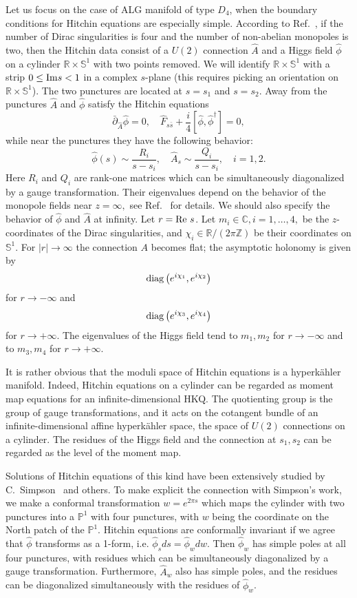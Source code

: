 \documentclass[a4paper,12pt, amsfonts, amssymb]{article}
\newcommand{\CC}{{\mathbb C}}
\newcommand{\RR}{{\mathbb R}}
\newcommand{\ZZ}{{\mathbb Z}}
\newcommand{\PP}{{\mathbb P}}
\renewcommand{\SS}{{\mathbb S}}
\newcommand{\diag}{{\rm diag}}
\newcommand{\ra}{\rightarrow}
\newcommand{\hphi}{{\hat\phi}}
\newcommand{\hA}{{\hat A}}
\newcommand{\bpartial}{{\bar\partial}}
\newcommand{\hF}{{\hat F}}
\newcommand{\bs}{{\bar s}}
\begin{document}
Let us focus on the case of ALG manifold of type $D_4$, when
the boundary conditions for Hitchin equations are especially simple.
According to Ref.~\cite{ustwo}, if the number of Dirac singularities is
four and the number of non-abelian monopoles is two, then the Hitchin data
consist of a $U(2)$ connection $\hA$ and a Higgs field $\hphi$ on a cylinder
$\RR\times\SS^1$ with two points removed. We will identify $\RR\times\SS^1$
with a strip $0\leq {\rm Im} s < 1$ in a complex $s$-plane (this requires picking an orientation on $\RR\times\SS^1$). The two punctures
are located at $s=s_1$ and $s=s_2$.
Away from the punctures $\hA$ and $\hphi$ satisfy the Hitchin
equations~\cite{HitchinSpec}
$$
\bpartial_\hA\hphi=0,\quad
\hF_{s\bs}+\frac{i}{4}\left[\hphi,\hphi^\dag\right]=0,
$$
while near the punctures they have the following behavior:
$$
\hphi(s)\sim \frac{R_i}{s-s_i},\quad \hA_s\sim \frac{Q_i}{s-s_i},\quad i=1,2.
$$
Here $R_i$ and $Q_i$ are rank-one matrices which can be simultaneously
diagonalized by a gauge transformation. Their eigenvalues depend on the
behavior of the monopole fields near $z=\infty,$ see Ref.~\cite{ustwo} for details.
We should also specify the behavior of $\hphi$ and $\hA$ at infinity.
Let $r={\rm Re}\ s$. Let $m_i\in\CC, i=1,\ldots,4,$ be the $z$-coordinates
of the Dirac singularities, and $\chi_i\in \RR/(2\pi\ZZ)$ be their
coordinates on $\SS^1$.
For $|r|\ra\infty$ the connection $A$ becomes flat; the asymptotic holonomy is given by
$$
\diag\left(e^{i\chi_1},e^{i\chi_2}\right)
$$
for $r\ra -\infty$ and
$$
\diag\left(e^{i\chi_3},e^{i\chi_4}\right)
$$
for $r\ra +\infty$.
The eigenvalues of the Higgs field tend to $m_1,m_2$ for $r\ra-\infty$
and to $m_3,m_4$ for $r\ra +\infty$.

It is rather obvious that the moduli space of Hitchin equations is a hyperk\"ahler manifold. Indeed, Hitchin equations on a
cylinder can be regarded as moment map equations for an infinite-dimensional
HKQ. The quotienting group is the group of gauge transformations, and
it acts on the cotangent bundle of an infinite-dimensional affine
hyperk\"ahler space, the space of $U(2)$ connections on a cylinder.
The residues of the Higgs field and the connection at $s_1,s_2$ can
be regarded as the level of the moment map.

Solutions of Hitchin equations of this kind have been extensively studied by C.~Simpson~\cite{Simpson} and others. To make explicit the connection
with Simpson's work, we make a conformal transformation $w=e^{2\pi s}$
which maps the cylinder with two punctures into a $\PP^1$ with four
punctures, with $w$ being the coordinate on the North patch of the $\PP^1$.
Hitchin equations are conformally invariant if we agree that
$\hphi$ transforms as a 1-form, i.e. $\hphi_s ds=\hphi_w dw$.
Then $\hphi_w$ has simple poles at all four punctures, with residues which
can be simultaneously diagonalized by a gauge transformation. Furthermore,
$\hA_w$ also has simple poles, and the residues can be diagonalized
simultaneously with the residues of $\hphi_w$.
\end{document}
